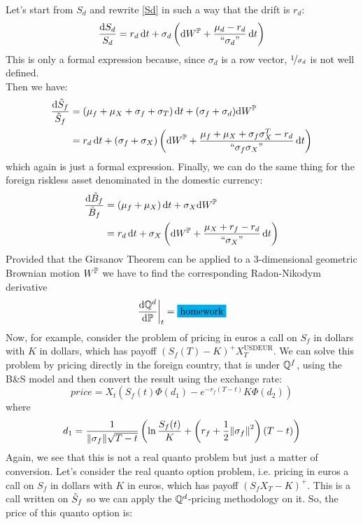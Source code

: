 Let's start from $S_d$ and rewrite \eqref{Sd} in such a way that the drift is $r_d$:
\begin{align}
    \frac{\dd S_d}{S_d} = r_d\,\dd t + \sigma_d\left(\dd W^{\mathbb{P}} + \frac{\mu_d-r_d}{``\sigma_d"}\,\dd t\right)
\end{align}
This is only a formal expression because, since $\sigma_d$ is a row vector, $\nicefrac{1}{\sigma_d}$ is not well defined.\\
Then we have:
\begin{align}
    \notag\frac{\dd\Tilde{S}_f}{\Tilde{S}_f} &= (\mu_f+\mu_X+\sigma_f+\sigma_T)\,\dd t + (\sigma_f + \sigma_d)\dd W^{\mathbb{P}} \\
    &=
    r_d\,\dd t + (\sigma_f+\sigma_X)\left(\dd W^{\mathbb{P}}+\dfrac{\mu_f + \mu_X + \sigma_f\sigma_X^T - r_d}{``\sigma_f\sigma_X"}\,\dd t\right)
\end{align}
which again is just a formal expression. Finally, we can do the same thing for the foreign riskless asset denominated in the domestic currency:
\begin{align}
    \notag\frac{\dd\Tilde{B}_f}{\Tilde{B}_f} &= (\mu_f+\mu_X)\,\dd t + \sigma_X\dd W^{\mathbb{P}} \\
    &=
    r_d\,\dd t + \sigma_X\left(\dd W^{\mathbb{P}}+\dfrac{\mu_X + r_f - r_d}{``\sigma_X"}\,\dd t\right) 
\end{align}
Provided that the Girsanov Theorem can be applied to a 3-dimensional geometric Brownian motion $W^{\mathbb{P}}$ we have to find the corresponding Radon-Nikodym derivative 
\begin{equation} %
    \eval{\dfrac{\dd\Qmeas^d}{\dd\Pmeas}}_t = \colorbox{cyan}{homework}
\end{equation}
Now, for example, consider the problem of pricing in euros a call on $S_f$ in dollars with $K$ in dollars, which has payoff $(S_f(T)-K)^+X_T^{\text{USDEUR}}$. We can solve this problem by pricing directly in the foreign country, that is under $\mathbb{Q}^f$, using the B\&S model and then convert the result using the exchange rate: 
\begin{equation}
    price = X_t(S_f(t)\Phi(d_1)-e^{-r_f(T-t)}K\Phi(d_2))
\end{equation}
where 
\begin{equation}
    d_1 = \frac{1}{\norm{\sigma_f}\sqrt{T-t}}\left(\ln\frac{S_f(t)}{K}+\left(r_f+\frac{1}{2}\norm{\sigma_f}^2\right)(T-t)\right)
\end{equation}
Again, we see that this is not a real quanto problem but just a matter of conversion.
Let's consider the real quanto option problem, i.e. pricing in euros a call on $S_f$ in dollars with $K$ in euros, which has payoff $(S_f X_T-K)^+$. This is a call written on $\Tilde{S}_f$ so we can apply the $\mathbb{Q}^d$-pricing methodology on it. So, the price of this quanto option is:
